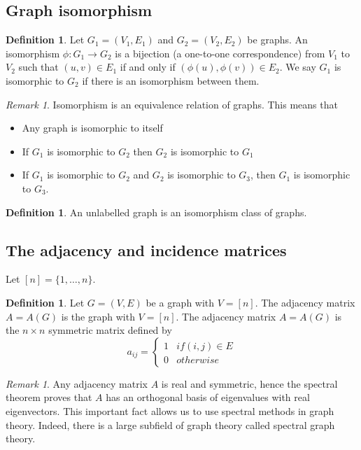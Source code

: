 \documentclass[11pt, fleqn, a4paper, landscape]{article}
\theoremstyle{plain} %
\theoremstyle{remark} %
\newtheorem{rem}[thm]{Remark}
\theoremstyle{definition} %
\newtheorem{defi}[thm]{Definition}
\begin{document}
\begin{multicols}{3}
\subsection{Graph isomorphism}
\addtocounter{thm}{1}
\begin{defi}
 Let $G_1 = (V_1,E_1)$ and $G_2 = (V_2,E_2)$ be graphs. An isomorphism $\phi: G_1 \to G_2$ is a bijection (a one-to-one correspondence) from $V_1$ to $V_2$ such that $(u, v) \in E_1$ if and only if $(\phi(u), \phi(v))\in E_2$. We say $G_1$ is isomorphic to $G_2$ if there is an isomorphism between them.
\end{defi}
\addtocounter{thm}{1}
\begin{rem}
Isomorphism is an equivalence relation of graphs. This means that
\begin{itemize}
\item Any graph is isomorphic to itself
\item If $G_1$ is isomorphic to $G_2$ then $G_2$ is isomorphic to $G_1$
\item If $G_1 $ is isomorphic to $G_2$ and $G_2$ is isomorphic to $G_3$, then $G_1$ is isomorphic to $G_3$.
\end{itemize}
\end{rem}


\begin{defi}
An unlabelled graph is an isomorphism class of graphs.
\end{defi} 

\subsection{The adjacency and incidence matrices}

Let $[n] = \{1, \dots , n\}.$

\begin{defi}
Let $G = (V,E)$ be a graph with $V = [n].$ The adjacency matrix $A = A(G)$ is the graph with $ V = [n]$. The adjacency matrix $A = A(G)$ is the
$n \times n $ symmetric matrix defined by
\[a_{ij}=\begin{cases}1 & if (i,j)\in E\\ 0 & otherwise\end{cases}\]
\end{defi} 
\addtocounter{thm}{1}
\begin{rem}
Any adjacency matrix $A $ is real and symmetric, hence the spectral theorem proves that $A$ has an orthogonal basis of eigenvalues with real eigenvectors. This important fact allows us to use spectral methods in graph theory. Indeed, there is a large subfield of graph theory called spectral graph theory.
\end{rem}


\end{multicols}
\end{document}
